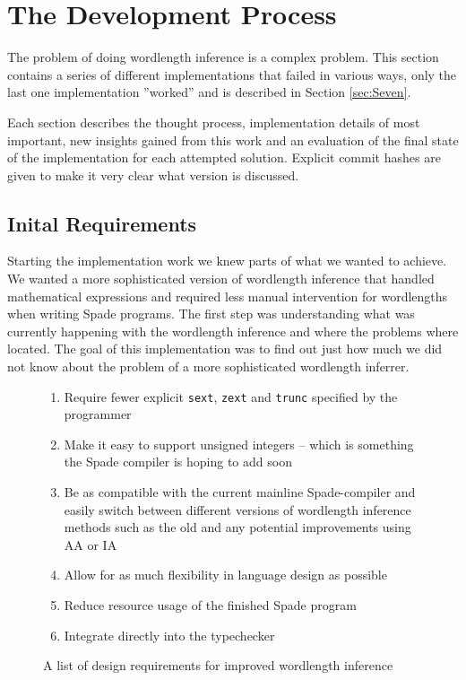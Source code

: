 \chapter{The Development Process}
\label{cha:Results}
The problem of doing wordlength inference is a complex problem. This section contains a series of different implementations that failed in various ways, only the last one implementation ''worked'' and is described in Section \ref{sec:Seven}.

Each section describes the thought process, implementation details of most important, new insights gained from this work and an evaluation of the final state of the implementation for each attempted solution. Explicit commit hashes are given to make it very clear what version is discussed.

\section{Inital Requirements}
\label{sec:initalReq}
Starting the implementation work we knew parts of what we wanted to achieve. We wanted a more sophisticated version of wordlength inference that handled mathematical expressions and required less manual intervention for wordlengths when writing Spade programs. The first step was understanding what was currently happening with the wordlength inference and where the problems where located. The goal of this implementation was to find out just how much we did not know about the problem of a more sophisticated wordlength inferrer.

\begin{figure}
\begin{enumerate}
    \item Require fewer explicit \verb|sext|, \verb|zext| and \verb|trunc| specified by the programmer
    \item Make it easy to support unsigned integers -- which is something the Spade compiler is hoping to add soon
    \item Be as compatible with the current mainline Spade-compiler and easily switch between different versions of wordlength inference methods such as the old and any potential improvements using AA or IA
    \item Allow for as much flexibility in language design as possible
    \item Reduce resource usage of the finished Spade program
    \item Integrate directly into the typechecker
\end{enumerate}
  \caption{A list of design requirements for improved wordlength inference}
  \label{figReq}
\end{figure}

